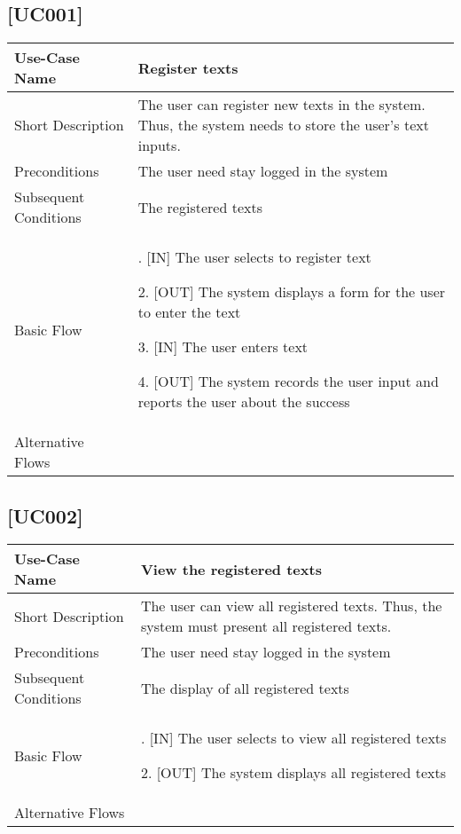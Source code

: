 \documentclass[11pt, twoside, a4paper]{book}
\begin{document}
			\subsection{[UC001]}
				\begin{tabular}{|>{\centering\arraybackslash}m{3cm} |>{\arraybackslash}m{9cm}|}												   \hline
					Use-Case Name 			& Register texts																							\\ \hline
					Short Description  		& The user can register new texts in the system. Thus, the system needs to store the user's text inputs.    \\ \hline	
					Preconditions  			& The user need stay logged in the system      																\\ \hline
					Subsequent Conditions	& The registered texts     																					\\ \hline
					Basic Flow  			& 	1. [IN] The user selects to register text
											
												2. [OUT] The system displays a form for the user to enter the text
											
												3. [IN] The user enters text
										
												4. [OUT] The system records the user input and reports the user about the success								\\ \hline
					Alternative Flows  		&       																									\\ \hline
				\end{tabular}
			
			\subsection{[UC002]}			
				\begin{tabular}{|>{\centering\arraybackslash}m{3cm} |>{\arraybackslash}m{9cm}|}										   \hline
					Use-Case Name 			& [UC002] View the registered texts																	\\ \hline
					Short Description  		& The user can view all registered texts. Thus, the system must present all registered texts.    	\\ \hline	
					Preconditions  			& The user need stay logged in the system      														\\ \hline
					Subsequent Conditions	& The display of all registered texts																\\ \hline
					Basic Flow  			& 	1. [IN] The user selects to view all registered texts														
											    
												2. [OUT] The system displays all registered texts														\\ \hline
				Alternative Flows  		&       																								\\ \hline
			\end{tabular}
\end{document}
